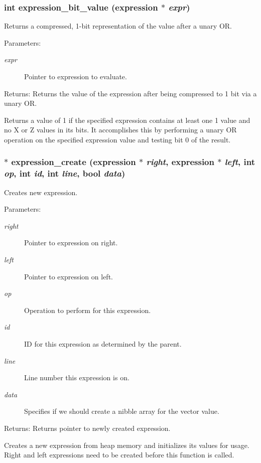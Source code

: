 \subsubsection{\setlength{\rightskip}{0pt plus 5cm}int expression\_\-bit\_\-value ({\bf expression} $\ast$ {\em expr})}\label{expr_8h_a12}


Returns a compressed, 1-bit representation of the value after a unary OR. 

\begin{Desc}
\item[Parameters:]
\begin{description}
\item[{\em expr}]Pointer to expression to evaluate.\end{description}
\end{Desc}
\begin{Desc}
\item[Returns:]Returns the value of the expression after being compressed to 1 bit via a unary OR.\end{Desc}
Returns a value of 1 if the specified expression contains at least one 1 value and no X or Z values in its bits. It accomplishes this by performing a unary OR operation on the specified expression value and testing bit 0 of the result. 
\subsubsection{$\ast$ expression\_\-create ({\bf expression} $\ast$ {\em right}, {\bf expression} $\ast$ {\em left}, int {\em op}, int {\em id}, int {\em line}, {\bf bool} {\em data})}\label{expr_8h_a1}


Creates new expression. 

\begin{Desc}
\item[Parameters:]
\begin{description}
\item[{\em right}]Pointer to expression on right. \item[{\em left}]Pointer to expression on left. \item[{\em op}]Operation to perform for this expression. \item[{\em id}]ID for this expression as determined by the parent. \item[{\em line}]Line number this expression is on. \item[{\em data}]Specifies if we should create a nibble array for the vector value.\end{description}
\end{Desc}
\begin{Desc}
\item[Returns:]Returns pointer to newly created expression.\end{Desc}
Creates a new expression from heap memory and initializes its values for usage. Right and left expressions need to be created before this function is called. 
